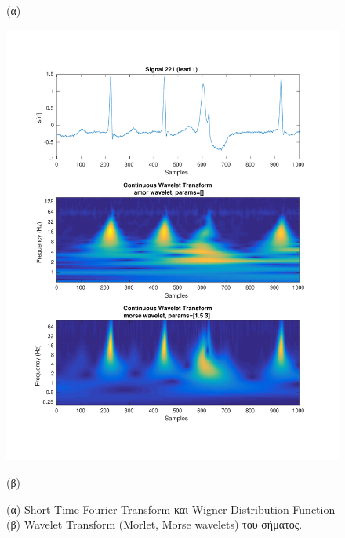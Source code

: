 \documentclass[11pt,a4paper]{article}
\begin{document}
\begin{figure}[H]
\begin{minipage}{0.48\textwidth}
	(α)
\end{minipage}
\begin{minipage}{0.48\textwidth}
	\centering
	\includegraphics[width=\textwidth]{fig/221l1_cwt.pdf}
	
	(β)
\end{minipage}
\vfill
\caption{(α) Short Time Fourier Transform και Wigner Distribution Function (β) Wavelet Transform (Morlet, Morse wavelets) του σήματος.}
\label{fig:221l1_stft_wdf_wt}
\end{figure}
\end{document}
